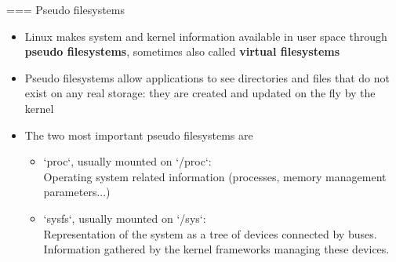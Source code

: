 === Pseudo filesystems
  \begin{itemize}
  \item Linux makes system and kernel information available in user
    space through {\bf pseudo filesystems}, sometimes also called {\bf
      virtual filesystems}
  \item Pseudo filesystems allow applications to see directories and
    files that do not exist on any real storage: they are created and
    updated on the fly by the kernel
  \item The two most important pseudo filesystems are
    \begin{itemize}
    \item `proc`, usually mounted on `/proc`: \\
      Operating system related information (processes, memory
      management parameters...)
    \item `sysfs`, usually mounted on `/sys`: \\
       Representation of the system as a tree of
       devices connected by buses. Information
       gathered by the kernel frameworks managing these devices.
    \end{itemize}
  \end{itemize}

